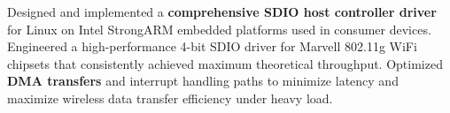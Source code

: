 \documentclass[12pt,a4paper]{pawesome-cv}
\begin{document}
\begin{cventries}
\begin{experiencecontent}
Designed and implemented a \textbf{comprehensive SDIO host controller driver} for Linux on Intel StrongARM embedded platforms used in consumer devices.
Engineered a high-performance 4-bit SDIO driver for Marvell 802.11g WiFi chipsets that consistently achieved maximum theoretical throughput.
Optimized \textbf{DMA transfers} and interrupt handling paths to minimize latency and maximize wireless data transfer efficiency under heavy load.\end{experiencecontent}
\end{cventries}
\end{document}
